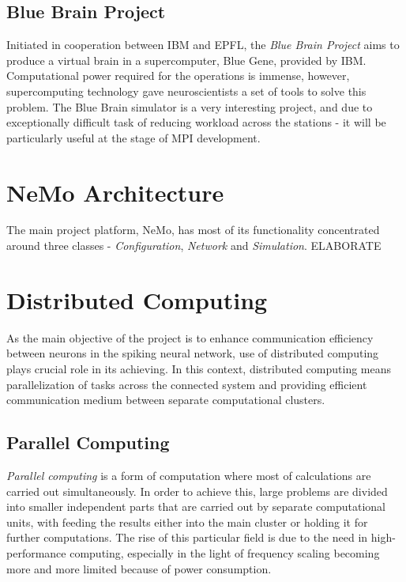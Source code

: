 \subsection{Blue Brain Project}

Initiated in cooperation between IBM and EPFL, the \emph{Blue Brain Project} aims to produce a virtual brain in a supercomputer, Blue Gene, provided by IBM.\cite{BlueBrain} Computational power
required for the operations is immense, however, supercomputing technology gave neuroscientists a set of tools to solve this problem. The Blue Brain simulator is
a very interesting project, and due to exceptionally difficult task of reducing workload across the stations - it will be particularly useful at the stage of MPI development.

\section{NeMo Architecture}

The main project platform, NeMo, has most of its functionality concentrated around three classes - \emph{Configuration}, \emph{Network} and \emph{Simulation}.
ELABORATE


\section{Distributed Computing}

As the main objective of the project is to enhance communication efficiency between neurons in the spiking neural network, use of distributed computing plays crucial
role in its achieving. In this context, distributed computing means parallelization of tasks across the connected system and providing efficient communication medium
between separate computational clusters.

\subsection{Parallel Computing}

\emph{Parallel computing} is a form of computation where most of calculations are carried out simultaneously.\cite{G.S.Almasi1989} In order to achieve this, large problems
are divided into smaller independent parts that are carried out by separate computational units, with feeding the results either into the main cluster or holding it for further
computations. The rise of this particular field is due to the need in high-performance computing, especially in the light of frequency scaling becoming more and more
limited because of power consumption.\cite{Kumar2002}

